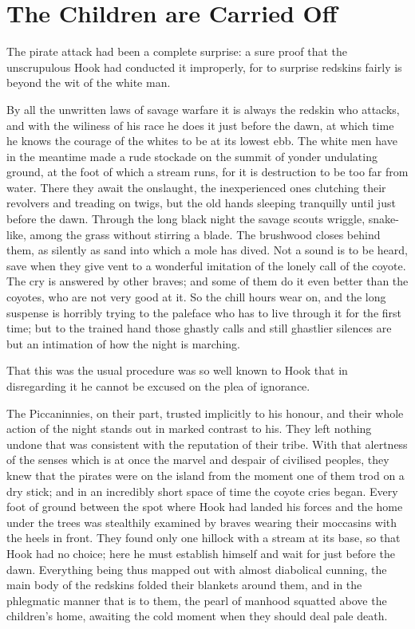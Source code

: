 
\chapter{The Children are Carried Off}

The pirate attack had been a complete surprise:
a sure proof that the unscrupulous Hook had conducted it improperly,
for to surprise redskins fairly is beyond the wit of the white man.

By all the unwritten laws of savage warfare it is always the redskin who attacks,
and with the wiliness of his race he does it just before the dawn,
at which time he knows the courage of the whites to be at its lowest ebb.
The white men have in the meantime made a rude stockade on the summit of yonder undulating ground,
at the foot of which a stream runs, for it is destruction to be too far from water.
There they await the onslaught,
the inexperienced ones clutching their revolvers and treading on twigs,
but the old hands sleeping tranquilly until just before the dawn.
Through the long black night the savage scouts wriggle, snake-like, among the grass without stirring a blade.
The brushwood closes behind them, as silently as sand into which a mole has dived.
Not a sound is to be heard, save when they give vent to a wonderful imitation of the lonely call of the coyote.
The cry is answered by other braves;
and some of them do it even better than the coyotes, who are not very good at it.
So the chill hours wear on,
and the long suspense is horribly trying to the paleface who has to live through it for the first time;
but to the trained hand those ghastly calls and still ghastlier silences
are but an intimation of how the night is marching.

That this was the usual procedure was so well known to Hook
that in disregarding it he cannot be excused on the plea of ignorance.

The Piccaninnies, on their part, trusted implicitly to his honour,
and their whole action of the night stands out in marked contrast to his.
They left nothing undone that was consistent with the reputation of their tribe.
With that alertness of the senses which is at once the marvel and despair of civilised peoples,
they knew that the pirates were on the island from the moment one of them trod on a dry stick;
and in an incredibly short space of time the coyote cries began.
Every foot of ground between the spot where Hook had landed his forces and the home under the trees
was stealthily examined by braves wearing their moccasins with the heels in front.
They found only one hillock with a stream at its base, so that Hook had no choice;
here he must establish himself and wait for just before the dawn.
Everything being thus mapped out with almost diabolical cunning,
the main body of the redskins folded their blankets around them,
and in the phlegmatic manner that is to them, the pearl of manhood squatted above the children's home,
awaiting the cold moment when they should deal pale death.

